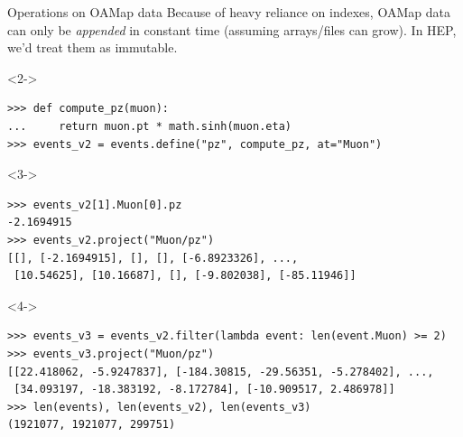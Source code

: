 \documentclass[aspectratio=169]{beamer}
\begin{document}
\begin{frame}[fragile]{Operations on OAMap data}
\vspace{0.3 cm}
Because of heavy reliance on indexes, OAMap data can only be {\it appended} in constant time (assuming arrays/files can grow). In HEP, we'd treat them as immutable.

\small
\begin{uncoverenv}<2->
\begin{verbatim}
>>> def compute_pz(muon):
...     return muon.pt * math.sinh(muon.eta)
>>> events_v2 = events.define("pz", compute_pz, at="Muon")
\end{verbatim}
\end{uncoverenv}
\begin{uncoverenv}<3->
\begin{verbatim}
>>> events_v2[1].Muon[0].pz
-2.1694915
>>> events_v2.project("Muon/pz")
[[], [-2.1694915], [], [], [-6.8923326], ...,
 [10.54625], [10.16687], [], [-9.802038], [-85.11946]]
\end{verbatim}
\end{uncoverenv}
\begin{uncoverenv}<4->
\begin{verbatim}
>>> events_v3 = events_v2.filter(lambda event: len(event.Muon) >= 2)
>>> events_v3.project("Muon/pz")
[[22.418062, -5.9247837], [-184.30815, -29.56351, -5.278402], ...,
 [34.093197, -18.383192, -8.172784], [-10.909517, 2.486978]]
>>> len(events), len(events_v2), len(events_v3)
(1921077, 1921077, 299751)
\end{verbatim}
\end{uncoverenv}
\end{frame}
\end{document}
